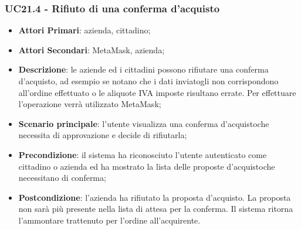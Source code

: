 \subsubsection{UC21.4 - Rifiuto di una conferma d'acquisto}
\begin{itemize}
	\item \textbf{Attori Primari}: azienda, cittadino;
	\item \textbf{Attori Secondari}: MetaMask\glo, azienda;
	\item \textbf{Descrizione}: le aziende ed i cittadini possono rifiutare una conferma d'acquisto\glo, ad esempio se notano che i dati inviatogli non corrispondono all'ordine effettuato o le aliquote IVA imposte risultano errate. Per effettuare l'operazione verrà utilizzato MetaMask\glo;
	\item \textbf{Scenario principale}: l'utente visualizza una conferma d'acquisto\glosp che necessita di approvazione e decide di rifiutarla;

	\item \textbf{Precondizione}: il sistema ha riconosciuto l'utente autenticato come cittadino o azienda ed ha mostrato la lista delle proposte d'acquisto\glosp che necessitano di conferma;
	\item \textbf{Postcondizione}: l'azienda ha rifiutato la proposta 
	d'acquisto\glo. La proposta non sarà più presente nella lista di attesa per 
	la conferma. Il sistema ritorna l'ammontare trattenuto per l'ordine 
	all'acquirente.
\end{itemize}
